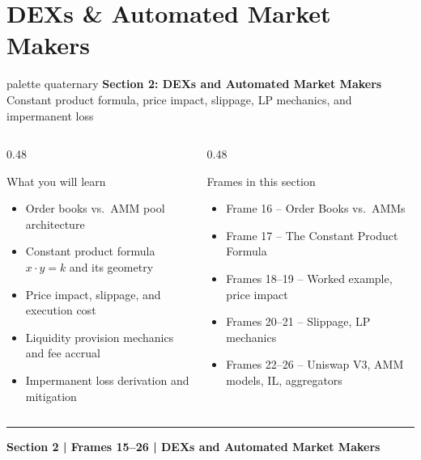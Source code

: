 \documentclass[8pt,aspectratio=169]{beamer}
\newcommand{\bottomnote}[1]{\vfill\vspace{-2mm}\textcolor{mllavender2}{\rule{\textwidth}{0.4pt}}\vspace{1mm}\footnotesize\textbf{#1}}
\begin{document}

\section{DEXs \& Automated Market Makers}

\begin{frame}
  \begin{beamercolorbox}[sep=12pt,center,rounded=true,shadow=true]{palette quaternary}
    {\Large\bfseries Section 2: DEXs and Automated Market Makers}\\{}\vspace{6pt}
    {\normalsize Constant product formula, price impact, slippage, LP mechanics, and impermanent loss}
  \end{beamercolorbox}
  \vspace{8mm}
  \begin{columns}[T]
    \begin{column}{0.48\textwidth}
      \begin{block}{What you will learn}
        \begin{itemize}\setlength\itemsep{2pt}
          \item Order books vs.\ AMM pool architecture
          \item Constant product formula $x \cdot y = k$ and its geometry
          \item Price impact, slippage, and execution cost
          \item Liquidity provision mechanics and fee accrual
          \item Impermanent loss derivation and mitigation
        \end{itemize}
      \end{block}
    \end{column}
    \begin{column}{0.48\textwidth}
      \begin{block}{Frames in this section}
        \begin{itemize}\setlength\itemsep{2pt}
          \item Frame 16 -- Order Books vs.\ AMMs
          \item Frame 17 -- The Constant Product Formula
          \item Frames 18--19 -- Worked example, price impact
          \item Frames 20--21 -- Slippage, LP mechanics
          \item Frames 22--26 -- Uniswap V3, AMM models, IL, aggregators
        \end{itemize}
      \end{block}
    \end{column}
  \end{columns}
  \bottomnote{Section 2 | Frames 15--26 | DEXs and Automated Market Makers}
\end{frame}
\end{document}
